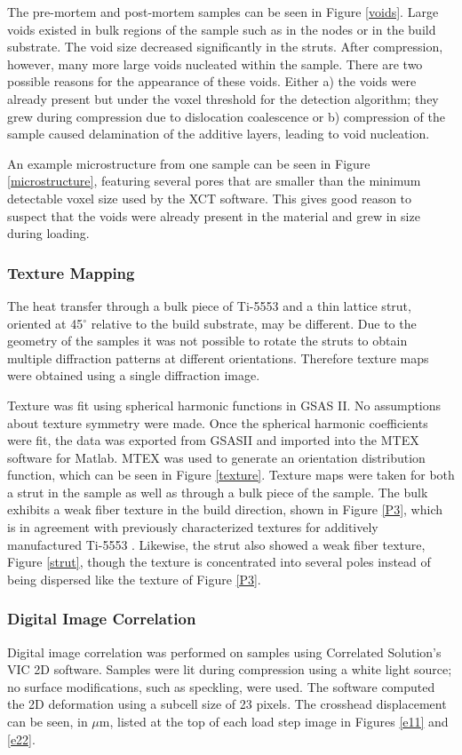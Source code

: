 The pre-mortem and post-mortem samples can be seen in Figure \ref{voids}. Large voids existed in bulk regions of the sample such as in the nodes or in the build substrate. The void size decreased significantly in the struts. After compression, however, many more large voids nucleated within the sample. There are two possible reasons for the appearance of these voids. Either a) the voids were already present but under the voxel threshold for the detection algorithm; they grew during compression due to dislocation coalescence or b) compression of the sample caused delamination of the additive layers, leading to void nucleation.

An example microstructure from one sample can be seen in Figure \ref{microstructure}, featuring several pores that are smaller than the minimum detectable voxel size used by the XCT software. This gives good reason to suspect that the voids were already present in the material and grew in size during loading.


\subsubsection{Texture Mapping}
The heat transfer through a bulk piece of Ti-5553 and a thin lattice strut, oriented at 45$^\circ$ relative to the build substrate, may be different. Due to the geometry of the samples it was not possible to rotate the struts to obtain multiple diffraction patterns at different orientations. Therefore texture maps were obtained using a single diffraction image. 

Texture was fit using spherical harmonic functions in GSAS II. No assumptions about texture symmetry were made. Once the spherical harmonic coefficients were fit, the data was exported from GSASII and imported into the MTEX software for Matlab. MTEX was used to generate an orientation distribution function, which can be seen in Figure \ref{texture}. Texture maps were taken for both a strut in the sample as well as through a bulk piece of the sample. The bulk exhibits a weak fiber texture in the build direction, shown in Figure \ref{P3}, which is in agreement with previously characterized textures for additively manufactured Ti-5553 \cite{Schwab2016}. Likewise, the strut also showed a weak fiber texture, Figure \ref{strut}, though the texture is concentrated into several poles instead of being dispersed like the texture of Figure \ref{P3}.


\subsubsection{Digital Image Correlation}
Digital image correlation was performed on samples using Correlated Solution's VIC 2D software. Samples were lit during compression using a white light source; no surface modifications, such as speckling, were used. The software computed the 2D deformation using a subcell size of 23 pixels. The crosshead displacement can be seen, in $\mu$m, listed at the top of each load step image in Figures \ref{e11} and \ref{e22}.

